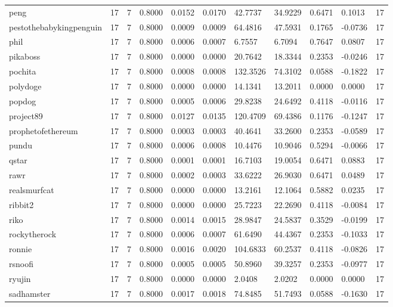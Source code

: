 \begin{table}[htbp]
\begin{tabular}{lllllllllll}
peng & 17 & 7 & 0.8000 & 0.0152 & 0.0170 & 42.7737 & 34.9229 & 0.6471 & 0.1013 & 17 \\
pestothebabykingpenguin & 17 & 7 & 0.8000 & 0.0009 & 0.0009 & 64.4816 & 47.5931 & 0.1765 & -0.0736 & 17 \\
phil & 17 & 7 & 0.8000 & 0.0006 & 0.0007 & 6.7557 & 6.7094 & 0.7647 & 0.0807 & 17 \\
pikaboss & 17 & 7 & 0.8000 & 0.0000 & 0.0000 & 20.7642 & 18.3344 & 0.2353 & -0.0246 & 17 \\
pochita & 17 & 7 & 0.8000 & 0.0008 & 0.0008 & 132.3526 & 74.3102 & 0.0588 & -0.1822 & 17 \\
polydoge & 17 & 7 & 0.8000 & 0.0000 & 0.0000 & 14.1341 & 13.2011 & 0.0000 & 0.0000 & 17 \\
popdog & 17 & 7 & 0.8000 & 0.0005 & 0.0006 & 29.8238 & 24.6492 & 0.4118 & -0.0116 & 17 \\
project89 & 17 & 7 & 0.8000 & 0.0127 & 0.0135 & 120.4709 & 69.4386 & 0.1176 & -0.1247 & 17 \\
prophetofethereum & 17 & 7 & 0.8000 & 0.0003 & 0.0003 & 40.4641 & 33.2600 & 0.2353 & -0.0589 & 17 \\
pundu & 17 & 7 & 0.8000 & 0.0006 & 0.0008 & 10.4476 & 10.9046 & 0.5294 & -0.0066 & 17 \\
qstar & 17 & 7 & 0.8000 & 0.0001 & 0.0001 & 16.7103 & 19.0054 & 0.6471 & 0.0883 & 17 \\
rawr & 17 & 7 & 0.8000 & 0.0002 & 0.0003 & 33.6222 & 26.9030 & 0.6471 & 0.0489 & 17 \\
realsmurfcat & 17 & 7 & 0.8000 & 0.0000 & 0.0000 & 13.2161 & 12.1064 & 0.5882 & 0.0235 & 17 \\
ribbit2 & 17 & 7 & 0.8000 & 0.0000 & 0.0000 & 25.7223 & 22.2690 & 0.4118 & -0.0084 & 17 \\
riko & 17 & 7 & 0.8000 & 0.0014 & 0.0015 & 28.9847 & 24.5837 & 0.3529 & -0.0199 & 17 \\
rockytherock & 17 & 7 & 0.8000 & 0.0006 & 0.0007 & 61.6490 & 44.4367 & 0.2353 & -0.1033 & 17 \\
ronnie & 17 & 7 & 0.8000 & 0.0016 & 0.0020 & 104.6833 & 60.2537 & 0.4118 & -0.0826 & 17 \\
rsnoofi & 17 & 7 & 0.8000 & 0.0005 & 0.0005 & 50.8960 & 39.3257 & 0.2353 & -0.0977 & 17 \\
ryujin & 17 & 7 & 0.8000 & 0.0000 & 0.0000 & 2.0408 & 2.0202 & 0.0000 & 0.0000 & 17 \\
sadhamster & 17 & 7 & 0.8000 & 0.0017 & 0.0018 & 74.8485 & 51.7493 & 0.0588 & -0.1630 & 17 \\

\end{tabular}
\end{table}
